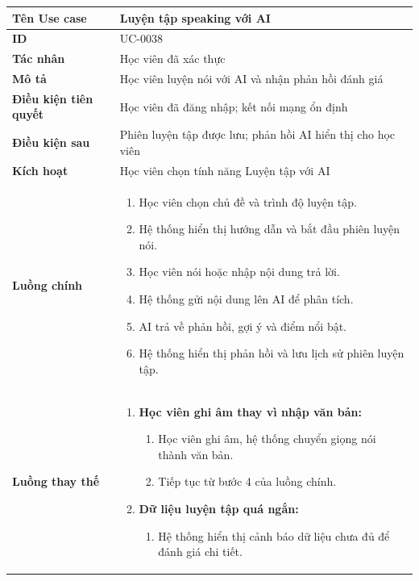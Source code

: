 {
\small
\renewcommand{\arraystretch}{1.15}

\begin{tabularx}{\textwidth}{|>{\raggedright\arraybackslash}p{3.5cm}|>{\raggedright\arraybackslash}X|}
\hline
\textbf{Tên Use case} & Luyện tập speaking với AI \\
\hline
\textbf{ID} & UC-0038 \\
\hline
\textbf{Tác nhân} & Học viên đã xác thực \\
\hline
\textbf{Mô tả} & Học viên luyện nói với AI và nhận phản hồi đánh giá \\
\hline
\textbf{Điều kiện tiên quyết} & Học viên đã đăng nhập; kết nối mạng ổn định \\
\hline
\textbf{Điều kiện sau} & Phiên luyện tập được lưu; phản hồi AI hiển thị cho học viên \\
\hline
\textbf{Kích hoạt} & Học viên chọn tính năng Luyện tập với AI \\
\hline
\textbf{Luồng chính} &
\begin{enumerate}
    \item Học viên chọn chủ đề và trình độ luyện tập.
    \item Hệ thống hiển thị hướng dẫn và bắt đầu phiên luyện nói.
    \item Học viên nói hoặc nhập nội dung trả lời.
    \item Hệ thống gửi nội dung lên AI để phân tích.
    \item AI trả về phản hồi, gợi ý và điểm nổi bật.
    \item Hệ thống hiển thị phản hồi và lưu lịch sử phiên luyện tập.
\end{enumerate} \\
\hline
\textbf{Luồng thay thế} &
\begin{enumerate}
    \item \textbf{Học viên ghi âm thay vì nhập văn bản:}
    \begin{enumerate}
        \item[3A.] Học viên ghi âm, hệ thống chuyển giọng nói thành văn bản.
        \item[4A.] Tiếp tục từ bước 4 của luồng chính.
    \end{enumerate}
    \item \textbf{Dữ liệu luyện tập quá ngắn:}
    \begin{enumerate}
        \item[5B.] Hệ thống hiển thị cảnh báo dữ liệu chưa đủ để đánh giá chi tiết.

\end{enumerate}
\end{enumerate}
\end{tabularx}}
